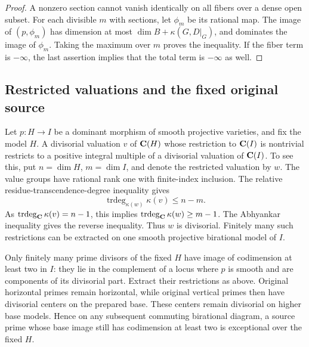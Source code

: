 \begin{proof}
A nonzero section cannot vanish identically on all fibers over a dense
open subset. For each divisible \(m\) with sections, let \(\phi_m\)
be its rational map. The image of \((p,\phi_m)\) has dimension at most
\(\dim B+\kappa(G,D|_G)\), and dominates the image of \(\phi_m\).
Taking the maximum over \(m\) proves the inequality. If the fiber term
is \(-\infty\), the last assertion implies that the total term is
\(-\infty\) as well.
\end{proof}

\subsection{Restricted valuations and the fixed original source}

Let $p:H\to I$ be a dominant morphism of smooth projective varieties,
and fix the model $H$. A divisorial valuation $v$ of $\mathbf C(H)$ whose
restriction to $\mathbf C(I)$ is nontrivial restricts to a positive integral
multiple of a divisorial valuation of $\mathbf C(I)$. To see this, put
$n=\dim H$, $m=\dim I$, and denote the restricted valuation by $w$.
The value groups have rational rank one with finite-index inclusion.
The relative residue-transcendence-degree inequality gives
\[
 \operatorname{trdeg}_{\kappa(w)}\kappa(v)\le n-m.
\]
As $\operatorname{trdeg}_{\mathbf C}\kappa(v)=n-1$, this implies
$\operatorname{trdeg}_{\mathbf C}\kappa(w)\ge m-1$. The Abhyankar
inequality gives the reverse inequality. Thus $w$ is divisorial.
Finitely many such restrictions can be extracted on one smooth
projective birational model of $I$.

Only finitely many prime divisors of the fixed $H$ have image of
codimension at least two in $I$: they lie in the complement of a
locus where $p$ is smooth and are components of its divisorial part.
Extract their restrictions as above. Original horizontal primes
remain horizontal, while original vertical primes then have
divisorial centers on the prepared base. These centers remain
divisorial on higher base models. Hence on any subsequent commuting
birational diagram, a source prime whose base image still has
codimension at least two is exceptional over the fixed $H$.

